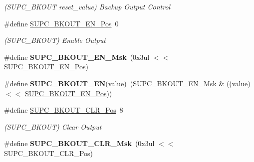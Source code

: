 \begin{DoxyCompactItemize}
\begin{DoxyCompactList}\small\item\em (S\+U\+P\+C\+\_\+\+B\+K\+O\+U\+T reset\+\_\+value) Backup Output Control \end{DoxyCompactList}\item 
\hypertarget{group___s_a_m_l21___s_u_p_c_gac8c7e3a15971f0ada2eb12816807fbed}{}\#define \hyperlink{group___s_a_m_l21___s_u_p_c_gac8c7e3a15971f0ada2eb12816807fbed}{S\+U\+P\+C\+\_\+\+B\+K\+O\+U\+T\+\_\+\+E\+N\+\_\+\+Pos}~0\label{group___s_a_m_l21___s_u_p_c_gac8c7e3a15971f0ada2eb12816807fbed}

\begin{DoxyCompactList}\small\item\em (S\+U\+P\+C\+\_\+\+B\+K\+O\+U\+T) Enable Output \end{DoxyCompactList}\item 
\hypertarget{group___s_a_m_l21___s_u_p_c_gac205cb6299c1eb098048e1188a868a1b}{}\#define {\bfseries S\+U\+P\+C\+\_\+\+B\+K\+O\+U\+T\+\_\+\+E\+N\+\_\+\+Msk}~(0x3ul $<$$<$ S\+U\+P\+C\+\_\+\+B\+K\+O\+U\+T\+\_\+\+E\+N\+\_\+\+Pos)\label{group___s_a_m_l21___s_u_p_c_gac205cb6299c1eb098048e1188a868a1b}

\item 
\hypertarget{group___s_a_m_l21___s_u_p_c_gacb663a3e169059aafa3129bb32664e1e}{}\#define {\bfseries S\+U\+P\+C\+\_\+\+B\+K\+O\+U\+T\+\_\+\+E\+N}(value)~(S\+U\+P\+C\+\_\+\+B\+K\+O\+U\+T\+\_\+\+E\+N\+\_\+\+Msk \& ((value) $<$$<$ \hyperlink{group___s_a_m_l21___s_u_p_c_gac8c7e3a15971f0ada2eb12816807fbed}{S\+U\+P\+C\+\_\+\+B\+K\+O\+U\+T\+\_\+\+E\+N\+\_\+\+Pos}))\label{group___s_a_m_l21___s_u_p_c_gacb663a3e169059aafa3129bb32664e1e}

\item 
\hypertarget{group___s_a_m_l21___s_u_p_c_gaedbc4f6fd0e8fc76d6a43a499a4ec2b3}{}\#define \hyperlink{group___s_a_m_l21___s_u_p_c_gaedbc4f6fd0e8fc76d6a43a499a4ec2b3}{S\+U\+P\+C\+\_\+\+B\+K\+O\+U\+T\+\_\+\+C\+L\+R\+\_\+\+Pos}~8\label{group___s_a_m_l21___s_u_p_c_gaedbc4f6fd0e8fc76d6a43a499a4ec2b3}

\begin{DoxyCompactList}\small\item\em (S\+U\+P\+C\+\_\+\+B\+K\+O\+U\+T) Clear Output \end{DoxyCompactList}\item 
\hypertarget{group___s_a_m_l21___s_u_p_c_ga8df12262d448166d6c4fd23af22202f5}{}\#define {\bfseries S\+U\+P\+C\+\_\+\+B\+K\+O\+U\+T\+\_\+\+C\+L\+R\+\_\+\+Msk}~(0x3ul $<$$<$ S\+U\+P\+C\+\_\+\+B\+K\+O\+U\+T\+\_\+\+C\+L\+R\+\_\+\+Pos)\label{group___s_a_m_l21___s_u_p_c_ga8df12262d448166d6c4fd23af22202f5}


\end{DoxyCompactItemize}

